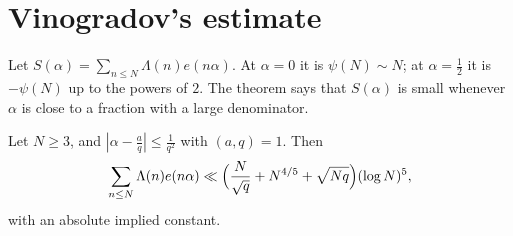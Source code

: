 \section{Vinogradov's estimate}

Let $S(\alpha)=\sum_{n\le N}\Lambda(n)e(n\alpha)$. At $\alpha=0$ it is $\psi(N)\sim N$; at $\alpha=\frac12$ it is $-\psi(N)$ up to the powers of $2$. The theorem says that $S(\alpha)$ is small whenever $\alpha$ is close to a fraction with a large denominator.

\begin{theorem}[Vinogradov, 1937]\label{thm:vinogradov3}
Let $N\ge3$, and $|\alpha-\frac aq|\le\frac1{q^2}$ with $(a,q)=1$. Then
\[
\sum_{n\le N}\Lambda(n)e(n\alpha)\ll\Bigl(\frac N{\sqrt q}+N^{4/5}+\sqrt{Nq}\Bigr)(\log N)^5,
\]
with an absolute implied constant.
\end{theorem}
